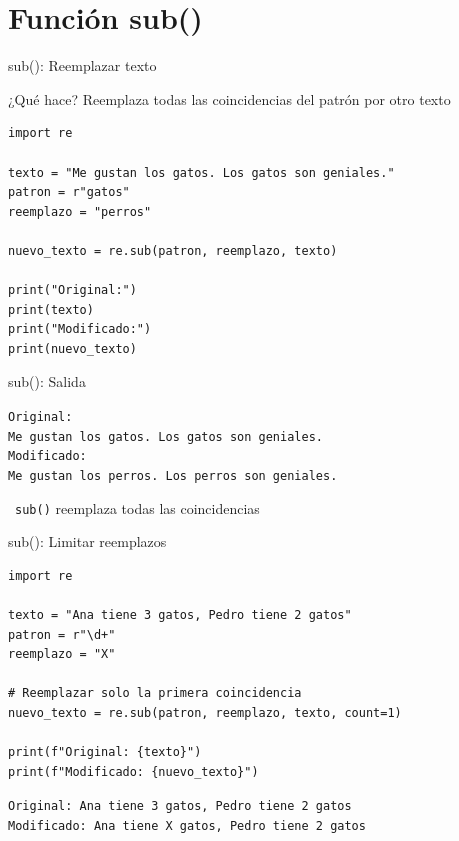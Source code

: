\documentclass{beamer}
\begin{document}
\section{Función sub()}

\begin{frame}[fragile]{sub(): Reemplazar texto \faExchangeAlt}
\begin{conceptbox}{¿Qué hace?}
Reemplaza todas las coincidencias del patrón por otro texto
\end{conceptbox}

\begin{lstlisting}
import re

texto = "Me gustan los gatos. Los gatos son geniales."
patron = r"gatos"
reemplazo = "perros"

nuevo_texto = re.sub(patron, reemplazo, texto)

print("Original:")
print(texto)
print("Modificado:")
print(nuevo_texto)
\end{lstlisting}
\end{frame}

\begin{frame}[fragile]{sub(): Salida \faArrowCircleRight}
\begin{tcolorbox}[colback=green!10,colframe=green,title={\small\faArrowCircleRight \ Salida},coltitle=fg0,left=3pt,right=3pt,top=3pt,bottom=3pt,boxsep=2pt]
\small\texttt{Original:\\
Me gustan los gatos. Los gatos son geniales.\\
Modificado:\\
Me gustan los perros. Los perros son geniales.}
\end{tcolorbox}

\vspace{0.3cm}
\begin{notebox}
\small\faCheckCircle\ \texttt{sub()} reemplaza todas las coincidencias
\end{notebox}
\end{frame}

\begin{frame}[fragile]{sub(): Limitar reemplazos \faEdit}
\begin{lstlisting}
import re

texto = "Ana tiene 3 gatos, Pedro tiene 2 gatos"
patron = r"\d+"
reemplazo = "X"

# Reemplazar solo la primera coincidencia
nuevo_texto = re.sub(patron, reemplazo, texto, count=1)

print(f"Original: {texto}")
print(f"Modificado: {nuevo_texto}")
\end{lstlisting}

\vspace{0.3cm}
\begin{tcolorbox}[colback=green!10,colframe=green,title={\small\faArrowCircleRight \ Salida},coltitle=fg0,left=3pt,right=3pt,top=3pt,bottom=3pt,boxsep=2pt]
\small\texttt{Original: Ana tiene 3 gatos, Pedro tiene 2 gatos\\
Modificado: Ana tiene X gatos, Pedro tiene 2 gatos}
\end{tcolorbox}
\end{frame}
\end{document}
